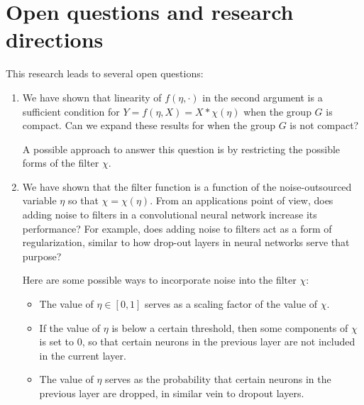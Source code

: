 

\section{Open questions and research directions}
This research leads to several open questions:
\begin{enumerate}
\item  
We have shown that linearity of $f(\eta, \cdot)$ in the second argument is a sufficient condition for $Y = f(\eta, X) = X * \chi(\eta)$ when the group $G$ is compact.
Can we expand these results for when the group $G$ is not compact?

A possible approach to answer this question is by restricting the possible forms of the filter $\chi$.

\item We have shown that the filter function is a function of the noise-outsourced variable $\eta$ so that $\chi = \chi(\eta)$.
From an applications point of view, does adding noise to filters in a convolutional neural network increase its performance?
For example, does adding noise to filters act as a form of regularization, similar to how drop-out layers in neural networks serve that purpose?

Here are some possible ways to incorporate noise into the filter $\chi$:
\begin{itemize}
	\item The value of $\eta \in [0,1]$ serves as a scaling factor of the value of $\chi$.
	\item If the value of $\eta$ is below a certain threshold, then some components of $\chi$ is set to $0$, so that certain neurons in the previous layer are not included in the current layer.
	\item The value of $\eta$ serves as the probability that certain neurons in the previous layer are dropped, in similar vein to dropout layers.
\end{itemize}
\end{enumerate}